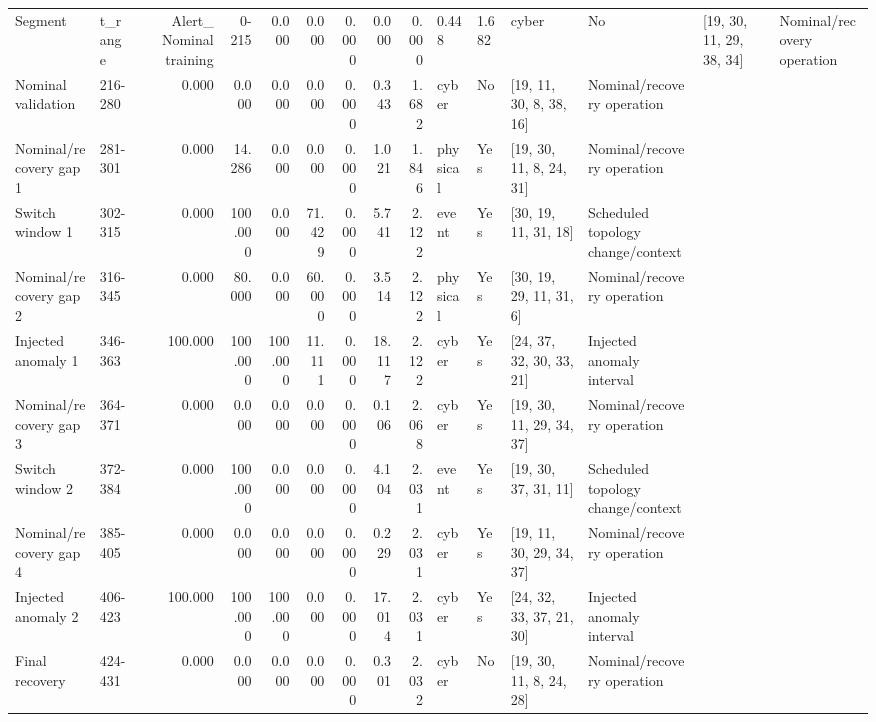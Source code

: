 \begin{tabular}{llrrrrrrrllll}
\toprule
Segment & t_range & Alert_%
\midrule
Nominal training & 0-215 & 0.000 & 0.000 & 0.000 & 0.000 & 0.000 & 0.448 & 1.682 & cyber & No & [19, 30, 11, 29, 38, 34] & Nominal/recovery operation \\
Nominal validation & 216-280 & 0.000 & 0.000 & 0.000 & 0.000 & 0.000 & 0.343 & 1.682 & cyber & No & [19, 11, 30, 8, 38, 16] & Nominal/recovery operation \\
Nominal/recovery gap 1 & 281-301 & 0.000 & 14.286 & 0.000 & 0.000 & 0.000 & 1.021 & 1.846 & physical & Yes & [19, 30, 11, 8, 24, 31] & Nominal/recovery operation \\
Switch window 1 & 302-315 & 0.000 & 100.000 & 0.000 & 71.429 & 0.000 & 5.741 & 2.122 & event & Yes & [30, 19, 11, 31, 18] & Scheduled topology change/context \\
Nominal/recovery gap 2 & 316-345 & 0.000 & 80.000 & 0.000 & 60.000 & 0.000 & 3.514 & 2.122 & physical & Yes & [30, 19, 29, 11, 31, 6] & Nominal/recovery operation \\
Injected anomaly 1 & 346-363 & 100.000 & 100.000 & 100.000 & 11.111 & 0.000 & 18.117 & 2.122 & cyber & Yes & [24, 37, 32, 30, 33, 21] & Injected anomaly interval \\
Nominal/recovery gap 3 & 364-371 & 0.000 & 0.000 & 0.000 & 0.000 & 0.000 & 0.106 & 2.068 & cyber & Yes & [19, 30, 11, 29, 34, 37] & Nominal/recovery operation \\
Switch window 2 & 372-384 & 0.000 & 100.000 & 0.000 & 0.000 & 0.000 & 4.104 & 2.031 & event & Yes & [19, 30, 37, 31, 11] & Scheduled topology change/context \\
Nominal/recovery gap 4 & 385-405 & 0.000 & 0.000 & 0.000 & 0.000 & 0.000 & 0.229 & 2.031 & cyber & Yes & [19, 11, 30, 29, 34, 37] & Nominal/recovery operation \\
Injected anomaly 2 & 406-423 & 100.000 & 100.000 & 100.000 & 0.000 & 0.000 & 17.014 & 2.031 & cyber & Yes & [24, 32, 33, 37, 21, 30] & Injected anomaly interval \\
Final recovery & 424-431 & 0.000 & 0.000 & 0.000 & 0.000 & 0.000 & 0.301 & 2.032 & cyber & No & [19, 30, 11, 8, 24, 28] & Nominal/recovery operation \\
\bottomrule
\end{tabular}
